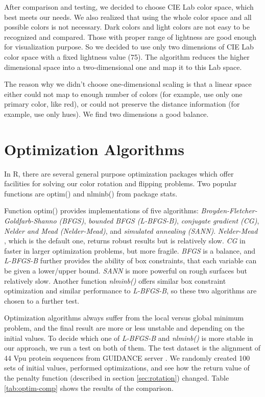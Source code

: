 After comparison and testing, we decided to choose CIE Lab color space, which best meets our needs. We also realized that using the whole color space and all possible colors is not necessary. Dark colors and light colors are not easy to be recognized and compared. Those with proper range of lightness are good enough for visualization purpose. So we decided to use only two dimensions of CIE Lab color space with a fixed lightness value (75). The algorithm reduces the higher dimensional space into a two-dimensional one and map it to this Lab space.

The reason why we didn’t choose one-dimensional scaling is that a linear space either could not map to enough number of colors (for example, use only one primary color, like red), or could not preserve the distance information (for example, use only hues). We find two dimensions a good balance.

\section{Optimization Algorithms}

In R, there are several general purpose optimization packages which offer facilities for solving our color rotation and flipping problems. Two popular functions are optim() and nlminb() from package stats.

Function optim() provides implementations of five algorithms: \emph{Broyden-Fletcher-Goldfarb-Shanno (BFGS)}, \emph{bounded BFGS (L-BFGS-B)}, \emph{conjugate gradient (CG)}, \emph{Nelder and Mead (Nelder-Mead)}, and \emph{simulated annealing (SANN)}. \emph{Nelder-Mead} \cite{Nelder:1965aa}, which is the default one, returns robust results but is relatively slow. \emph{CG} \cite{Fletcher:1964aa} in faster in larger optimization problems, but more fragile. \emph{BFGS} is a balance, and \emph{L-BFGS-B} further provides the ability of box constraints, that each variable can be given a lower/upper bound. \emph{SANN} \cite{Belisle:1992aa} is more powerful on rough surfaces but relatively slow. Another function \emph{nlminb()} offers similar box constraint optimization and similar performance to \emph{L-BFGS-B}, so these two algorithms are chosen to a further test.

Optimization algorithms always suffer from the local versus global minimum problem, and the final result are more or less unstable and depending on the initial values. To decide which one of \emph{L-BFGS-B} and \emph{nlminb()} is more stable in our approach, we run a test on both of them. The test dataset is the alignment of 44 Vpu protein sequences from GUIDANCE server \cite{Penn:2010ab}. We randomly created 100 sets of initial values, performed optimizations, and see how the return value of the penalty function (described in section \ref{sec:rotation}) changed. Table \ref{tab:optim-comp} shows the results of the comparison. 

